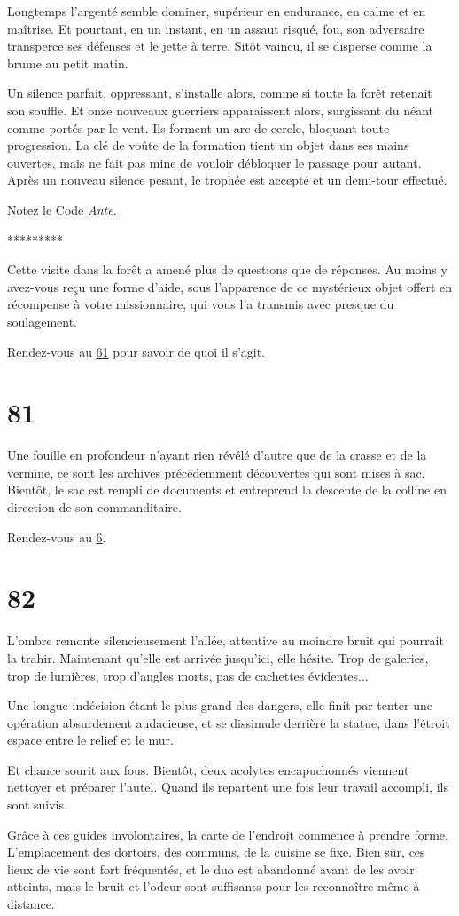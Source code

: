 \documentclass{report}
\newcommand{\gsection}[1]{
    \section{#1}
    \label{section-#1}
}
\newcommand{\glink}[1]{\hyperref[section-#1]{#1}}
\newcommand{\ellipse}{
    \begin{center}
        *********
    \end{center}
}
\begin{document}
Longtemps l'argenté semble dominer, supérieur en endurance, en calme et en maîtrise. Et pourtant, en un instant, en un assaut risqué, fou, son adversaire transperce ses défenses et le jette à terre. Sitôt vaincu, il se disperse comme la brume au petit matin.

Un silence parfait, oppressant, s'installe alors, comme si toute la forêt retenait son souffle. Et onze nouveaux guerriers apparaissent alors, surgissant du néant comme portés par le vent. Ils forment un arc de cercle, bloquant toute progression. La clé de voûte de la formation tient un objet dans ses mains ouvertes, mais ne fait pas mine de vouloir débloquer le passage pour autant. Après un nouveau silence pesant, le trophée est accepté et un demi-tour effectué.

Notez le Code \emph{Ante}.

\ellipse

Cette visite dans la forêt a amené plus de questions que de réponses. Au moins y avez-vous reçu une forme d'aide, sous l'apparence de ce mystérieux objet offert en récompense à votre missionnaire, qui vous l'a transmis avec presque du soulagement.

Rendez-vous au \glink{61} pour savoir de quoi il s'agit.

\gsection{81}

Une fouille en profondeur n'ayant rien révélé d'autre que de la crasse et de la vermine, ce sont les archives précédemment découvertes qui sont mises à sac. Bientôt, le sac est rempli de documents et entreprend la descente de la colline en direction de son commanditaire.

Rendez-vous au \glink{6}.

\gsection{82}

L'ombre remonte silencieusement l'allée, attentive au moindre bruit qui pourrait la trahir. Maintenant qu'elle est arrivée jusqu'ici, elle hésite. Trop de galeries, trop de lumières, trop d'angles morts, pas de cachettes évidentes...

Une longue indécision étant le plus grand des dangers, elle finit par tenter une opération absurdement audacieuse, et se dissimule derrière la statue, dans l'étroit espace entre le relief et le mur.

Et chance sourit aux fous. Bientôt, deux acolytes encapuchonnés viennent nettoyer et préparer l'autel. Quand ils repartent une fois leur travail accompli, ils sont suivis.

Grâce à ces guides involontaires, la carte de l'endroit commence à prendre forme. L'emplacement des dortoirs, des communs, de la cuisine se fixe. Bien sûr, ces lieux de vie sont fort fréquentés, et le duo est abandonné avant de les avoir atteints, mais le bruit et l'odeur sont suffisants pour les reconnaître même à distance.
\end{document}
